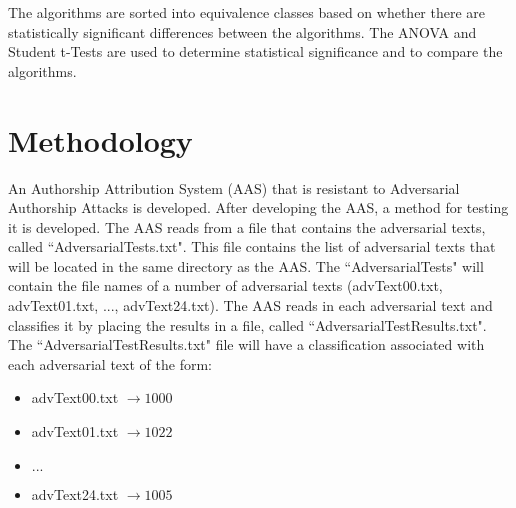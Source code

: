 \documentclass[conference]{IEEEtran}
\begin{document}
The algorithms are sorted into equivalence classes based on whether there are statistically significant differences between the algorithms. The ANOVA and Student t-Tests are used to determine statistical significance and to compare the algorithms. 


%
%

\section{Methodology}

An Authorship Attribution System (AAS) that is resistant to Adversarial Authorship Attacks is developed. After developing the AAS, a method for testing it is developed. The AAS reads from a file that contains the adversarial texts, called ``AdversarialTests.txt". This file contains the list of adversarial texts that will be located in the same directory as the AAS. The ``AdversarialTests" will contain the file names of a number of adversarial texts (advText00.txt, advText01.txt, ..., advText24.txt). The AAS reads in each adversarial text and classifies it by placing the results in a file, called ``AdversarialTestResults.txt". The ``AdversarialTestResults.txt" file will have a classification associated with each adversarial text of the form: 
\begin{itemize}
\item advText00.txt \begin{math}\rightarrow 1000\end{math}
\item advText01.txt \begin{math}\rightarrow 1022\end{math}
\item \begin{math}...\end{math}
\item advText24.txt \begin{math}\rightarrow 1005\end{math}
\end{itemize}
\end{document}
